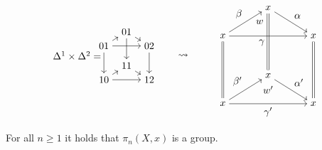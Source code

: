 \[
    \begin{tikzpicture}
    \begin{scope}
        \node (0) at (-1.75,0) {$\Delta^1 \times \Delta^2 =$};
        \node (A) at (0, 0.85) {$01$};
        \node (B) at (-0.8, 0.35) {$01$};
        \node (C) at (0.8, 0.35) {$02$};
        \node (D) at (0, -0.35) {$11$};
        \node (E) at (-0.8, -0.85) {$10$};
        \node (F) at (0.8, -0.85) {$12$};
        \draw[->] (A) to (C);
        \draw[->] (A) to (D);
        \draw[->] (B) to (C);
        \draw[->] (B) to (A);
        \draw[->] (B) to (E);
        \draw[->] (C) to (F);
        \draw[->] (D) to (F);
        \draw[->] (E) to (F);
        \draw[->] (E) to (D);
    \end{scope}

    \begin{scope}[xshift=5cm]
        \node(arrow) at ( -3,0) {$\rightsquigarrow$};
        \node (A) at (0, 1.7) {$x$};
        \node (w) at (-0.3, 1.2) {$w$};
        \node (B) at (-1.6, 0.7) {$x$};
        \node (C) at (1.6, 0.7) {$x$};
        \node (D) at (0, -0.7) {$x$};
        \node (w') at (0, -1.2) {$w'$};
        \node (E) at (-1.6, -1.7) {$x$};
        \node (F) at (1.6, -1.7) {$x$};
        \draw[->] (A) to node[above right ]{$\alpha$} (C) ;
        \draw[double equal sign distance] (A) to (D) ;
        \draw[->] (B) to node[below left]{$\gamma$} (C);
        \draw[->] (B) to node[above left]{$\beta$} (A);
        \draw[double equal sign distance] (B) to (E) ;
        \draw[double equal sign distance] (C) to (F);
        \draw[->] (D) to node[above right ]{$\alpha'$} (F);
        \draw[->] (E) to node[below]{$\gamma'$} (F);
        \draw[->] (E) to node[above left]{$\beta'$} (D);
    \end{scope}
    \end{tikzpicture}
\]
\begin{prop}
    For all $n \geq 1$ it holds that $ \pi_n(X,x)$ is a group.
\end{prop}

